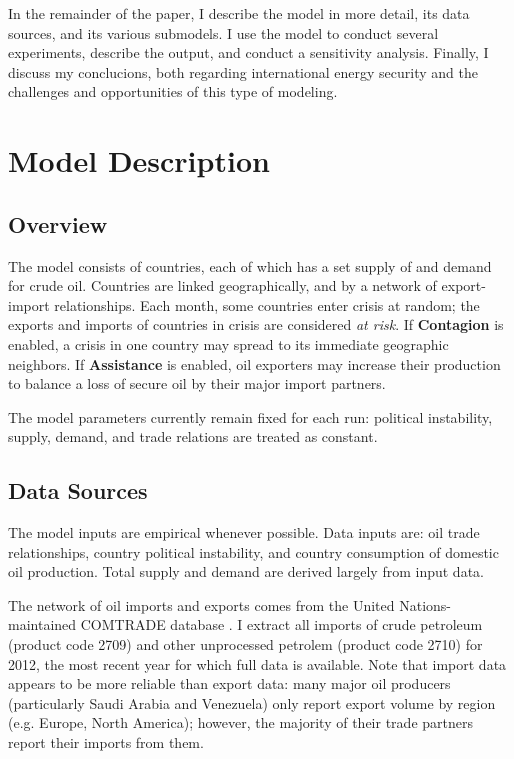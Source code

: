 \documentclass{article}
\begin{document}
In the remainder of the paper, I describe the model in more detail, its data sources, and its various submodels. I use the model to conduct several experiments, describe the output, and conduct a sensitivity analysis. Finally, I discuss my conclucions, both regarding international energy security and the challenges and opportunities of this type of modeling.

\section{Model Description}

\subsection{Overview}

The model consists of countries, each of which has a set supply of and demand for crude oil. Countries are linked geographically, and by a network of export-import relationships. Each month, some countries enter crisis at random; the exports and imports of countries in crisis are considered \emph{at risk}. If \textbf{Contagion} is enabled, a crisis in one country may spread to its immediate geographic neighbors. If \textbf{Assistance} is enabled, oil exporters may increase their production to balance a loss of secure oil by their major import partners.

The model parameters currently remain fixed for each run: political instability, supply, demand, and trade relations are treated as constant. 

\subsection{Data Sources}
The model inputs are empirical whenever possible. Data inputs are: oil trade relationships, country political instability, and country consumption of domestic oil production. Total supply and demand are derived largely from input data.

The network of oil imports and exports comes from the United Nations-maintained COMTRADE database \citep{un_2013}. I extract all imports of crude petroleum (product code 2709) and other unprocessed petrolem (product code 2710) for 2012, the most recent year for which full data is available. Note that import data appears to be more reliable than export data: many major oil producers (particularly Saudi Arabia and Venezuela) only report export volume by region (e.g. Europe, North America); however, the majority of their trade partners report their imports from them.
\end{document}
